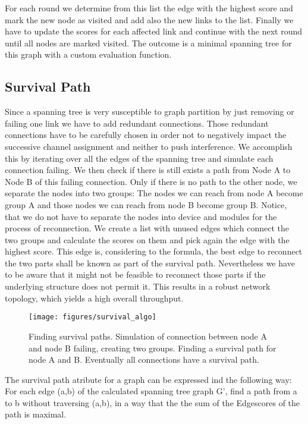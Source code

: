   For each round we determine from this list the edge with the highest score and mark the new node as visited and add also the new links to the list.
  Finally we have to update the scores for each affected link and continue with the next round until all nodes are marked visited.
  The outcome is a minimal spanning tree for this graph with a custom evaluation function.
  \subsection{Survival Path}
  Since a spanning tree is very susceptible to graph partition by just removing or failing one link we have to add redundant connections.
  Those redundant connections have to be carefully chosen in order not to negatively impact the successive channel assignment and neither to push interference.
  We accomplish this by iterating over all the edges of the spanning tree and simulate each connection failing. We then check if there is still exists 
  a path from Node A to Node B of this failing connection. Only if there is no path to the other node, we separate the nodes into two groups:
  The nodes we can reach from node A become group A and those nodes we can reach from node B become group B.
  Notice, that we do not have to separate the nodes into device and modules for the process of reconnection.
  We create a list with unused edges which connect the two groups and calculate the scores on them and pick again the edge with the highest score.
  This edge is, considering to the formula, the best edge to reconnect the two parts shall be known as part of the survival path.
  Nevertheless we have to be aware that it might not be feasible to reconnect those parts if the underlying structure does not permit it.
  This results in a robust network topology, which yields a high overall throughput.
  \begin{figure}[h]
    \centering
    \texttt{[image: figures/survival\_algo]}
    \caption{Finding survival paths. Simulation of connection between node A and node B failing, creating two groups.
    Finding a survival path for node A and B. Eventually all connections have a survival path.}
    \label{fig:survival_algo}
  \end{figure}
  The survival path atribute for a graph can be expressed ind the following way:
  For each edge (a,b) of the calculated spanning tree graph G', find a path from a to b without traversing (a,b), 
  in a way that the the sum of the Edgescores of the path is maximal.

